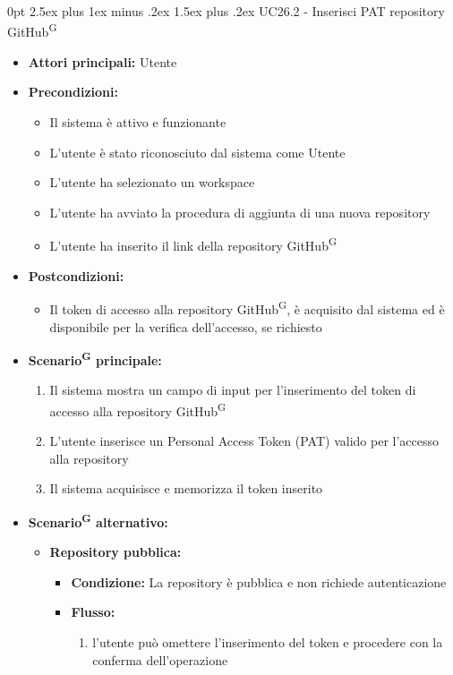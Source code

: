 \documentclass[a4paper, 11pt]{article}
\makeatletter
\renewcommand\paragraph{\@startsection{paragraph}{4}
  {0pt}
  {2.5ex plus 1ex minus .2ex}
  {1.5ex plus .2ex}
  {\normalfont\normalsize\bfseries\color{AccentDark}}}
\makeatother
\begin{document}
\paragraph{UC26.2 - Inserisci PAT repository GitHub\textsuperscript{G}}\label{UC26.2}
\begin{itemize}
	\item \textbf{Attori principali:} Utente
	\item \textbf{Precondizioni:}
	\begin{itemize}
		\item Il sistema è attivo e funzionante
		\item L'utente è stato riconosciuto dal sistema come Utente
		\item L'utente ha selezionato un workspace
		\item L'utente ha avviato la procedura di aggiunta di una nuova repository
		\item L'utente ha inserito il link della repository GitHub\textsuperscript{G}
	\end{itemize}
	\item \textbf{Postcondizioni:}
	\begin{itemize}
		\item Il token di accesso alla repository GitHub\textsuperscript{G}, è acquisito dal sistema ed è disponibile per la verifica dell'accesso, se richiesto
	\end{itemize}
	\item \textbf{Scenario\textsuperscript{G} principale:}
	\begin{enumerate}
		\item Il sistema mostra un campo di input per l'inserimento del token di accesso alla repository GitHub\textsuperscript{G}
		\item L'utente inserisce un Personal Access Token (PAT) valido per l'accesso alla repository
		\item Il sistema acquisisce e memorizza il token inserito
	\end{enumerate}
		\item \textbf{Scenario\textsuperscript{G} alternativo:}
	\begin{itemize}
		\item \textbf{Repository pubblica:}
			\begin{itemize}
				\item \textbf{Condizione:} La repository è pubblica e non richiede autenticazione
				\item \textbf{Flusso:}
				\begin{enumerate}
					\item l'utente può omettere l'inserimento del token e procedere con la conferma dell'operazione
				\end{enumerate}
			\end{itemize}
	\end{itemize}
\end{itemize}
\end{document}
